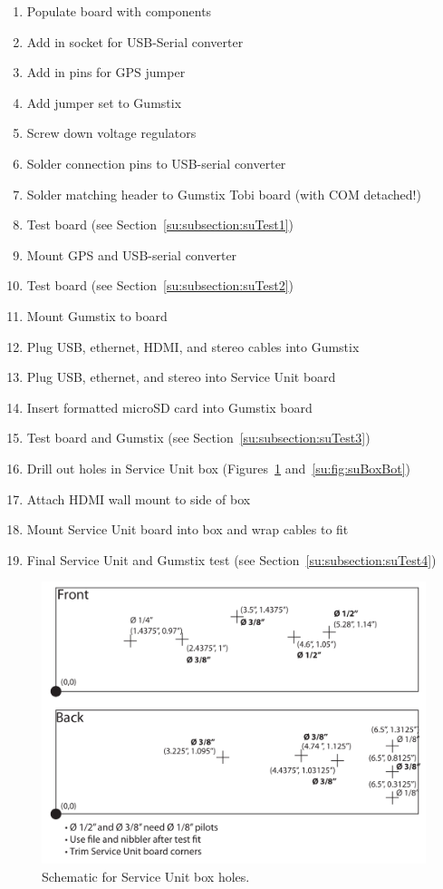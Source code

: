 \begin{enumerate}
\item{Populate board with components}
\item{Add in socket for USB-Serial converter}
\item{Add in pins for GPS jumper}
\item{Add jumper set to Gumstix}
\item{Screw down voltage regulators}
\item{Solder connection pins to USB-serial converter}
\item{Solder matching header to Gumstix Tobi board (with COM detached!)}
\item{Test board (see Section~\ref{su:subsection:suTest1})}
\item{Mount GPS and USB-serial converter}
\item{Test board (see Section~\ref{su:subsection:suTest2})}
\item{Mount Gumstix to board}
\item{Plug USB, ethernet, HDMI, and stereo cables into Gumstix}
\item{Plug USB, ethernet, and stereo into Service Unit board}
\item{Insert formatted microSD card into Gumstix board}
\item{Test board and Gumstix (see Section~\ref{su:subsection:suTest3})}
\item{Drill out holes in Service Unit box (Figures~\ref{su:fig:suBox} and~\ref{su:fig:suBoxBot})}
\item{Attach HDMI wall mount to side of box}
\item{Mount Service Unit board into box and wrap cables to fit}
\item{Final Service Unit and Gumstix test (see Section~\ref{su:subsection:suTest4})}
\end{enumerate}

\begin{landscape}
\begin{figure}[ht!]
   \centering
   \includegraphics[scale=1]{Appendix/Figures/su_box_holes_sides.pdf} 
   \caption{Schematic for Service Unit box holes.}
   \label{su:fig:suBox}
\end{figure}
\end{landscape}

